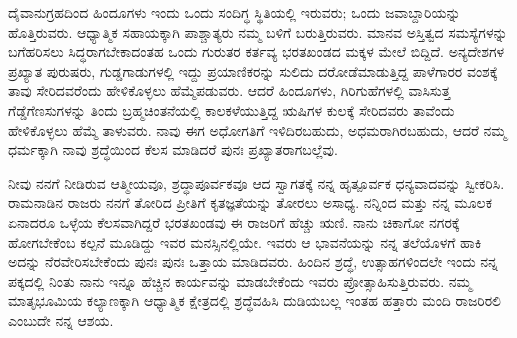 ದೈವಾನುಗ್ರಹದಿಂದ ಹಿಂದೂಗಳು ಇಂದು ಒಂದು ಸಂದಿಗ್ಧ ಸ್ಥಿತಿಯಲ್ಲಿ ಇರುವರು; ಒಂದು ಜವಾಬ್ದಾರಿಯನ್ನು ಹೊತ್ತಿರುವರು. ಆಧ್ಯಾತ್ಮಿಕ ಸಹಾಯಕ್ಕಾಗಿ ಪಾಶ್ಚಾತ್ಯರು ನಮ್ಮ ಬಳಿಗೆ ಬರುತ್ತಿರುವರು. ಮಾನವ ಅಸ್ತಿತ್ವದ ಸಮಸ್ಯೆಗಳನ್ನು ಬಗೆಹರಿಸಲು ಸಿದ್ಧರಾಗಬೇಕಾದಂತಹ ಒಂದು ಗುರುತರ ಕರ್ತವ್ಯ ಭರತಖಂಡದ ಮಕ್ಕಳ ಮೇಲೆ ಬಿದ್ದಿದೆ. ಅನ್ಯದೇಶಗಳ ಪ್ರಖ್ಯಾತ ಪುರುಷರು, ಗುಡ್ಡಗಾಡುಗಳಲ್ಲಿ ಇದ್ದು ಪ್ರಯಾಣಿಕರನ್ನು ಸುಲಿದು ದರೋಡೆಮಾಡುತ್ತಿದ್ದ ಪಾಳೆಗಾರರ ವಂಶಕ್ಕೆ ತಾವು ಸೇರಿದವರೆಂದು ಹೇಳಿಕೊಳ್ಳಲು ಹೆಮ್ಮೆಪಡುವರು. ಆದರೆ ಹಿಂದೂಗಳು, ಗಿರಿಗುಹೆಗಳಲ್ಲಿ ವಾಸಿಸುತ್ತ ಗೆಡ್ಡೆಗೆಣಸುಗಳನ್ನು ತಿಂದು ಬ್ರಹ್ಮಚಿಂತನೆಯಲ್ಲಿ ಕಾಲಕಳೆಯುತ್ತಿದ್ದ ಋಷಿಗಳ ಕುಲಕ್ಕೆ ಸೇರಿದವರು ತಾವೆಂದು ಹೇಳಿಕೊಳ್ಳಲು ಹೆಮ್ಮೆ ತಾಳುವರು. ನಾವು ಈಗ ಅಧೋಗತಿಗೆ ಇಳಿದಿರಬಹುದು, ಅಧಮರಾಗಿರಬಹುದು, ಆದರೆ ನಮ್ಮ ಧರ್ಮಕ್ಕಾಗಿ ನಾವು ಶ್ರದ್ಧೆಯಿಂದ ಕೆಲಸ ಮಾಡಿದರೆ ಪುನಃ ಪ್ರಖ್ಯಾತರಾಗಬಲ್ಲೆವು.

ನೀವು ನನಗೆ ನೀಡಿರುವ ಆತ್ಮೀಯವೂ, ಶ್ರದ್ಧಾಪೂರ್ವಕವೂ ಆದ ಸ್ವಾಗತಕ್ಕೆ ನನ್ನ ಹೃತ್ಪೂರ್ವಕ ಧನ್ಯವಾದವನ್ನು ಸ್ವೀಕರಿಸಿ. ರಾಮನಾಡಿನ ರಾಜರು ನನಗೆ ತೋರಿದ ಪ್ರೀತಿಗೆ ಕೃತಜ್ಞತೆಯನ್ನು ತೋರಲು ಅಸಾಧ್ಯ. ನನ್ನಿಂದ ಮತ್ತು ನನ್ನ ಮೂಲಕ ಏನಾದರೂ ಒಳ್ಳೆಯ ಕೆಲಸವಾಗಿದ್ದರೆ ಭರತಖಂಡವು ಈ ರಾಜರಿಗೆ ಹೆಚ್ಚು ಋಣಿ. ನಾನು ಚಿಕಾಗೋ ನಗರಕ್ಕೆ ಹೋಗಬೇಕೆಂಬ ಕಲ್ಪನೆ ಮೂಡಿದ್ದು ಇವರ ಮನಸ್ಸಿನಲ್ಲಿಯೇ. ಇವರು ಆ ಭಾವನೆಯನ್ನು ನನ್ನ ತಲೆಯೊಳಗೆ ಹಾಕಿ ಅದನ್ನು ನೆರವೇರಿಸಬೇಕೆಂದು ಪುನಃ ಪುನಃ ಒತ್ತಾಯ ಮಾಡಿದವರು. ಹಿಂದಿನ ಶ್ರದ್ಧೆ, ಉತ್ಸಾಹಗಳಿಂದಲೇ ಇಂದು ನನ್ನ ಪಕ್ಕದಲ್ಲಿ ನಿಂತು ನಾನು ಇನ್ನೂ ಹೆಚ್ಚಿನ ಕಾರ್ಯವನ್ನು ಮಾಡಬೇಕೆಂದು ಇವರು ಪ್ರೋತ್ಸಾಹಿಸುತ್ತಿರುವರು. ನಮ್ಮ ಮಾತೃಭೂಮಿಯ ಕಲ್ಯಾಣಕ್ಕಾಗಿ ಆಧ್ಯಾತ್ಮಿಕ ಕ್ಷೇತ್ರದಲ್ಲಿ ಶ್ರದ್ಧೆವಹಿಸಿ ದುಡಿಯಬಲ್ಲ ಇಂತಹ ಹತ್ತಾರು ಮಂದಿ ರಾಜರಿರಲಿ ಎಂಬುದೇ ನನ್ನ ಆಶಯ.

